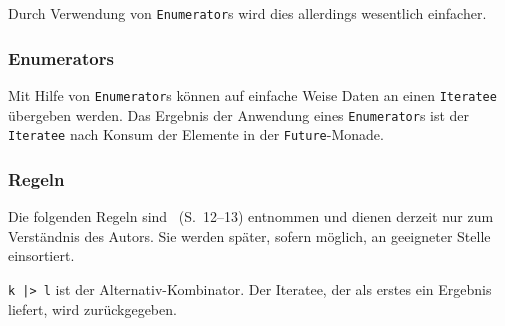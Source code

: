 \documentclass[draft=false
              ,paper=a4
              ,twoside=false
              ,fontsize=11pt
              ,headsepline
              ,BCOR10mm
              ,DIV11
              ]{scrbook}
\begin{document}
Durch Verwendung von \lstinline|Enumerator|s wird dies allerdings wesentlich einfacher.



\subsubsection{Enumerators} %
\label{ssub:enumerators}

Mit Hilfe von \lstinline|Enumerator|s können auf einfache Weise Daten an einen \lstinline|Iteratee| übergeben werden.
Das Ergebnis der Anwendung eines \lstinline|Enumerator|s ist der \lstinline|Iteratee| nach Konsum der Elemente in der \lstinline|Future|-Monade.



\subsubsection{Regeln} %
\label{ssub:regeln}

Die folgenden Regeln sind \citealt{kiselyov2012}~(S.~12--13) entnommen und dienen derzeit nur zum Verständnis des Autors.
Sie werden später, sofern möglich, an geeigneter Stelle einsortiert.

\lstinline!k |> l! ist der Alternativ-Kombinator. Der Iteratee, der als erstes ein Ergebnis liefert, wird zurückgegeben.
\end{document}
